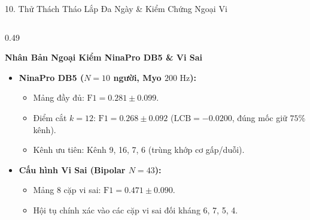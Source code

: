\documentclass[aspectratio=169,10pt]{beamer}
\begin{document}
\begin{frame}{10. Thử Thách Tháo Lắp Đa Ngày \& Kiểm Chứng Ngoại Vi}
\begin{columns}[T]
        \begin{column}{0.49\textwidth}
            \begin{exampleblock}{\textbf{Nhân Bản Ngoại Kiểm NinaPro DB5 \& Vi Sai}}
                \scriptsize
                \begin{itemize}
                    \item \textbf{NinaPro DB5 ($N=10$ người, Myo $200\text{ Hz}$):}
                    \begin{itemize}
                        \item Mảng đầy đủ: $\text{F1} = 0.281 \pm 0.099$.
                        \item Điểm cắt $k=12$: $\text{F1} = 0.268 \pm 0.092$ ($\text{LCB} = -0.0200$, đúng mốc giữ $75\%$ kênh).
                        \item Kênh ưu tiên: Kênh 9, 16, 7, 6 (trùng khớp cơ gấp/duỗi).
                    \end{itemize}
                    \item \textbf{Cấu hình Vi Sai (Bipolar $N=43$):}
                    \begin{itemize}
                        \item Mảng 8 cặp vi sai: $\text{F1} = 0.471 \pm 0.090$.
                        \item Hội tụ chính xác vào các cặp vi sai đối kháng 6, 7, 5, 4.
                    \end{itemize}
                \end{itemize}
            \end{exampleblock}
        \end{column}
    \end{columns}
\end{frame}
\end{document}
